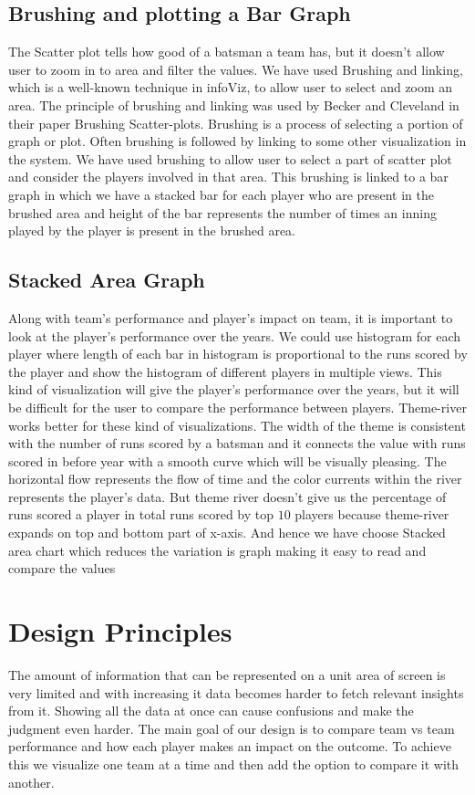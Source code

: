 \documentclass[10pt,journal,compsoc]{IEEEtran}
\begin{document}
\subsection{Brushing and plotting a Bar Graph}
The Scatter plot tells how good of a batsman a team has, but it doesn't allow user to zoom in to area and filter the values. We have used Brushing and linking, which is a well-known technique in infoViz, to allow user to select and zoom an area. The principle of brushing and linking was used by Becker and Cleveland in their paper Brushing Scatter-plots\cite{scatterplots1}. Brushing is a process of selecting a portion of graph or plot. Often brushing is followed by linking to some other visualization in the system. We have used brushing to allow user to select a part of scatter plot and consider the players involved in that area. This brushing is linked to a bar graph in which we have a stacked bar for each player who are present in the brushed area and height of the bar represents the number of times an inning played by the player is present in the brushed area.

\subsection{Stacked Area Graph}
Along with team's performance and player's impact on team, it is important to look at the player's performance over the years. We could use histogram for each player where length of each bar in histogram is proportional to the runs scored by the player and show the histogram of different players in multiple views. This kind of visualization will give the player's performance over the years, but it will be difficult for the user to compare the performance between players. Theme-river\cite{themeriver} works better for these kind of visualizations. The width of the theme is consistent with the number of runs scored by a batsman and it connects the value with runs scored in before year with a smooth curve which will be visually pleasing. The horizontal flow represents the flow of time and the color currents within the river represents the player's data. But theme river doesn't give us the percentage of runs scored a player in total runs scored by top $10$ players because theme-river expands on top and bottom part of x-axis. And hence we have choose Stacked area chart\cite{stackedgraph1} which reduces the variation is graph making it easy to read and compare the values

\section {Design Principles}
The amount of information that can be represented on a unit area of screen is very limited and with increasing it data becomes harder to fetch relevant insights from it. Showing all the data at once can cause confusions and make the judgment even harder. The main goal of our design is to compare team vs team performance and how each player makes an impact on the outcome. To achieve this we visualize one team at a time and then add the option to compare it with another.\\
\end{document}
